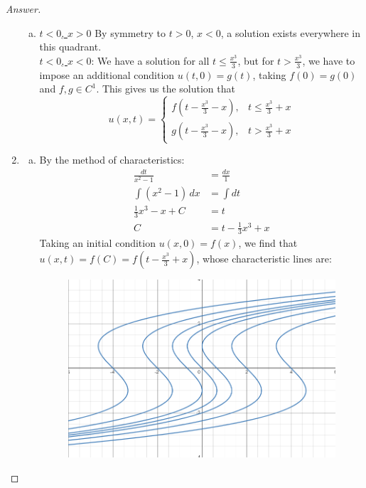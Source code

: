 \documentclass{article}
\theoremstyle{definition}
\renewcommand\qedsymbol{$\blacksquare$}
\newenvironment{ans}{\begin{proof}[Answer]\renewcommand{\qedsymbol}{}}{\end{proof}}
\begin{document}
\begin{ans}
\begin{enumerate}[(1), series=answers]
\begin{enumerate}[a)]
                    \item \underline{$t < 0$, $x > 0$} By symmetry to $t > 0$, $x < 0$, a solution exists everywhere in this quadrant.\\
                    \underline{$t < 0$, $x < 0$}: We have a solution for all $t \leq  \frac{x^3}{3}$, but for $t > \frac{x^3}{3}$, we have to impose an additional condition $u(t,0) = g(t)$, taking $f(0)=g(0)$ and $f,g\in C^1$. This gives us the solution that \begin{equation*}
                    u(x,t) =
                    \begin{cases}
                        f\left(t - \frac{x^3}{3} - x\right), & t \leq \frac{x^3}{3} + x\\
                        g\left(t - \frac{x^3}{3} - x\right), & t > \frac{x^3}{3} + x
                    \end{cases}
                    \end{equation*}
                \end{enumerate}

                \item \begin{enumerate}[a)]
                    \item By the method of characteristics:
                    \begin{align*}
                        \frac{dt}{x^2-1} &= \frac{dx}{1}\\
                        \int (x^2-1)\,dx &= \int dt\\
                        \frac{1}{3}x^3 - x + C &= t\\
                        C &= t - \frac{1}{3}x^3 + x
                    \end{align*}
                    Taking an initial condition $u(x, 0) = f(x)$, we find that $\boxed{u(x,t) = f(C) = f\left(t - \frac{x^3}{3} + x\right)}$, whose characteristic lines are:
                    \begin{figure}[H]
                        \centering
                        \includegraphics[width=2.3 in]{13 graph.png}
                    \end{figure}
                    

\end{enumerate}
\end{enumerate}
\end{ans}
\end{document}
